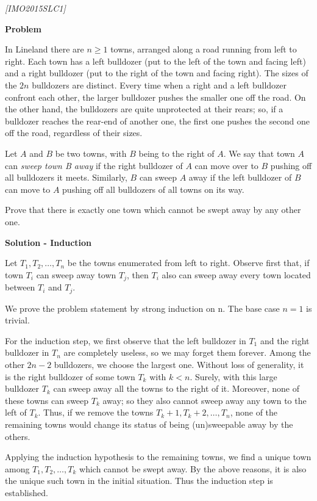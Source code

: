 \filbreak
\begin{problem}
\textit{[IMO2015SLC1]}

\textbf{Problem}

 In Lineland there are $n \ge 1$ towns, arranged along a road running from left to right. Each town has a left bulldozer (put to the left of the town and facing left) and a right bulldozer (put to the right of the town and facing right). The sizes of the $2n$ bulldozers are distinct. Every time when a right and a left bulldozer confront each other, the larger bulldozer pushes the smaller one oﬀ the road. On the other hand, the bulldozers are quite unprotected at their rears; so, if a bulldozer reaches the rear-end of another one, the ﬁrst one pushes the second one oﬀ the road, regardless of their sizes. 
 
Let $A$ and $B$ be two towns, with $B$ being to the right of $A$. We say that town $A$ can \textit{sweep town B away} if the right bulldozer of $A$ can move over to $B$ pushing oﬀ all bulldozers it meets. Similarly, $B$ can sweep $A$ away if the left bulldozer of $B$ can move to $A$ pushing oﬀ all bulldozers of all towns on its way. 

Prove that there is exactly one town which cannot be swept away by any other one. 


\textbf{Solution - Induction}

 Let $T_1,T_2,\dots,T_n$ be the towns enumerated from left to right. Observe ﬁrst that, if town $T_i$ can sweep away town $T_j$, then $T_i$ also can sweep away every town located between $T_i$ and $T_j$. 
 
 We prove the problem statement by strong induction on n. The base case $n = 1$ is trivial. 
 
 For the induction step, we ﬁrst observe that the left bulldozer in $T_1$ and the right bulldozer in $T_n$ are completely useless, so we may forget them forever. Among the other $2n-2$ bulldozers, we choose the largest one. Without loss of generality, it is the right bulldozer of some town $T_k$ with $k < n$. Surely, with this large bulldozer $T_k$ can sweep away all the towns to the right of it. Moreover, none of these towns can sweep $T_k$ away; so they also cannot sweep away any town to the left of $T_k$. Thus, if we remove the towns $T_k+1,T_k+2,\dots,T_n$, none of the remaining towns would change its status of being (un)sweepable away by the others. 
 
 Applying the induction hypothesis to the remaining towns, we ﬁnd a unique town among $T_1,T_2,\dots,T_k$ which cannot be swept away. By the above reasons, it is also the unique such town in the initial situation. Thus the induction step is established.

\end{problem}

